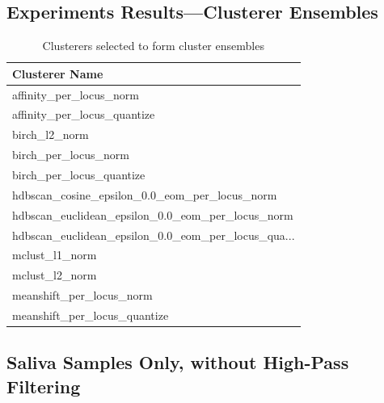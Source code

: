 \begin{theappendices}
\section{Experiments Results---Clusterer Ensembles}

\begin{table}
\centering
\begin{tabular}{l}
\toprule
                                    Clusterer Name \\
\midrule
                           affinity\_per\_locus\_norm \\
                       affinity\_per\_locus\_quantize \\
                                     birch\_l2\_norm \\
                              birch\_per\_locus\_norm \\
                          birch\_per\_locus\_quantize \\
     hdbscan\_cosine\_epsilon\_0.0\_eom\_per\_locus\_norm \\
  hdbscan\_euclidean\_epsilon\_0.0\_eom\_per\_locus\_norm \\
hdbscan\_euclidean\_epsilon\_0.0\_eom\_per\_locus\_qua... \\
                                    mclust\_l1\_norm \\
                                    mclust\_l2\_norm \\
                          meanshift\_per\_locus\_norm \\
                      meanshift\_per\_locus\_quantize \\
\bottomrule
\end{tabular}
\caption{Clusterers selected to form cluster ensembles}
\label{table:Clusterers selected to form cluster ensembles}
\end{table}

\subsection{Saliva Samples Only, without High-Pass Filtering}


\end{theappendices}
